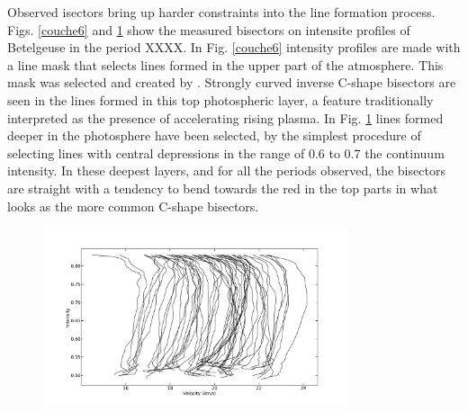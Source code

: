 \documentclass{/Users/art2/TeX/aanda/aa}
\def\kms {km\,s$^{-1}$}
\begin{document}
Observed isectors bring up harder constraints into the line formation process. Figs. \ref{couche6} and \ref{couche0} show the measured 
bisectors on intensite profiles of Betelgeuse in the period XXXX. In Fig. \ref{couche6} intensity profiles are made with a line mask 
that selects lines formed in the upper part of the atmosphere. This mask was selected and created by \cite{Kravchenko}. Strongly curved 
inverse C-shape bisectors are seen in the lines formed in this top photospheric layer, a feature traditionally interpreted as the 
presence of accelerating rising plasma.   In Fig. \ref{couche0} lines formed deeper in the photosphere have been selected, by the simplest 
procedure of selecting lines with central depressions in the range of 0.6 to 0.7 the continuum intensity. In these deepest layers, and 
for all the periods observed, the bisectors are straight with a tendency to bend towards the red in the top parts in what looks as 
the more common C-shape bisectors.
\begin{figure}
   \includegraphics[width=0.8\textwidth]{bissecteurmaskKateryna.png}
   \caption{ }
   \label{couche0}
   \end{figure}
\end{document}
